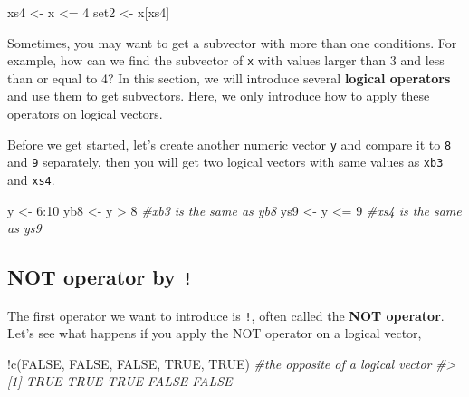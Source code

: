 \documentclass[
]{book}
\newenvironment{Shaded}{\begin{snugshade}}{\end{snugshade}}
\newcommand{\CommentTok}[1]{\textcolor[rgb]{0.56,0.35,0.01}{\textit{#1}}}
\newcommand{\ConstantTok}[1]{\textcolor[rgb]{0.00,0.00,0.00}{#1}}
\newcommand{\DecValTok}[1]{\textcolor[rgb]{0.00,0.00,0.81}{#1}}
\newcommand{\FunctionTok}[1]{\textcolor[rgb]{0.00,0.00,0.00}{#1}}
\newcommand{\NormalTok}[1]{#1}
\newcommand{\OtherTok}[1]{\textcolor[rgb]{0.56,0.35,0.01}{#1}}
\newcommand{\SpecialCharTok}[1]{\textcolor[rgb]{0.00,0.00,0.00}{#1}}
\begin{document}
\begin{Shaded}
\begin{Highlighting}[]
\NormalTok{xs4 }\OtherTok{\textless{}{-}}\NormalTok{ x }\SpecialCharTok{\textless{}=} \DecValTok{4}
\NormalTok{set2 }\OtherTok{\textless{}{-}}\NormalTok{ x[xs4]}
\end{Highlighting}
\end{Shaded}

Sometimes, you may want to get a subvector with more than one conditions. For example, how can we find the subvector of \texttt{x} with values larger than 3 and less than or equal to 4? In this section, we will introduce several \textbf{logical operators} and use them to get subvectors. Here, we only introduce how to apply these operators on logical vectors.

Before we get started, let's create another numeric vector \texttt{y} and compare it to \texttt{8} and \texttt{9} separately, then you will get two logical vectors with same values as \texttt{xb3} and \texttt{xs4}.

\begin{Shaded}
\begin{Highlighting}[]
\NormalTok{y }\OtherTok{\textless{}{-}} \DecValTok{6}\SpecialCharTok{:}\DecValTok{10}
\NormalTok{yb8 }\OtherTok{\textless{}{-}}\NormalTok{ y }\SpecialCharTok{\textgreater{}} \DecValTok{8}           \CommentTok{\#xb3 is the same as yb8}
\NormalTok{ys9 }\OtherTok{\textless{}{-}}\NormalTok{ y }\SpecialCharTok{\textless{}=} \DecValTok{9}          \CommentTok{\#xs4 is the same as ys9}
\end{Highlighting}
\end{Shaded}

\hypertarget{not-operator-by}{%
\subsection{\texorpdfstring{NOT operator by \texttt{!}}{NOT operator by !}}\label{not-operator-by}}

The first operator we want to introduce is \texttt{!}, often called the \textbf{NOT operator}. Let's see what happens if you apply the NOT operator on a logical vector,

\begin{Shaded}
\begin{Highlighting}[]
\SpecialCharTok{!}\FunctionTok{c}\NormalTok{(}\ConstantTok{FALSE}\NormalTok{, }\ConstantTok{FALSE}\NormalTok{, }\ConstantTok{FALSE}\NormalTok{, }\ConstantTok{TRUE}\NormalTok{, }\ConstantTok{TRUE}\NormalTok{)  }\CommentTok{\#the opposite of a logical vector}
\CommentTok{\#\textgreater{} [1]  TRUE  TRUE  TRUE FALSE FALSE}
\end{Highlighting}
\end{Shaded}
\end{document}
